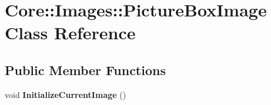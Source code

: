 \hypertarget{class_core_1_1_images_1_1_picture_box_image}{
\section{Core::Images::PictureBoxImage Class Reference}
\label{class_core_1_1_images_1_1_picture_box_image}
}
\subsection*{Public Member Functions}
\begin{DoxyCompactItemize}
\item 
\hypertarget{class_core_1_1_images_1_1_picture_box_image_a45f1dfefcd6edffac692a1e0b15a2a8e}{
void {\bfseries InitializeCurrentImage} ()}
\label{class_core_1_1_images_1_1_picture_box_image_a45f1dfefcd6edffac692a1e0b15a2a8e}

\end{DoxyCompactItemize}
